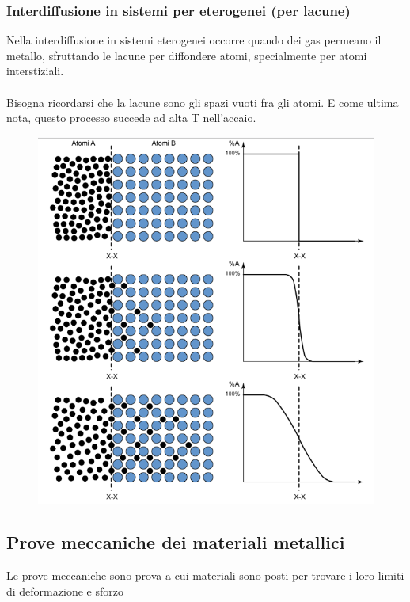 \documentclass{article}
\begin{document}
            \subsubsection{Interdiffusione in sistemi per eterogenei (per lacune)}
                Nella interdiffusione in sistemi eterogenei occorre quando dei gas permeano il metallo, sfruttando le lacune per diffondere atomi, specialmente per atomi interstiziali.\\ \\
                Bisogna ricordarsi che la lacune sono gli spazi vuoti fra gli atomi. E come ultima nota, questo processo succede ad alta T nell'accaio.
                \begin{figure}[!h]
                    \centering
                    \includegraphics[width=.75\linewidth]{Interdiffusione in sistemi eterogeni (per lacune).png}
                \end{figure}
        \newpage
        \subsection{Prove meccaniche dei materiali metallici}
            Le prove meccaniche sono prova a cui materiali sono posti per trovare i loro limiti di deformazione e sforzo
\end{document}
